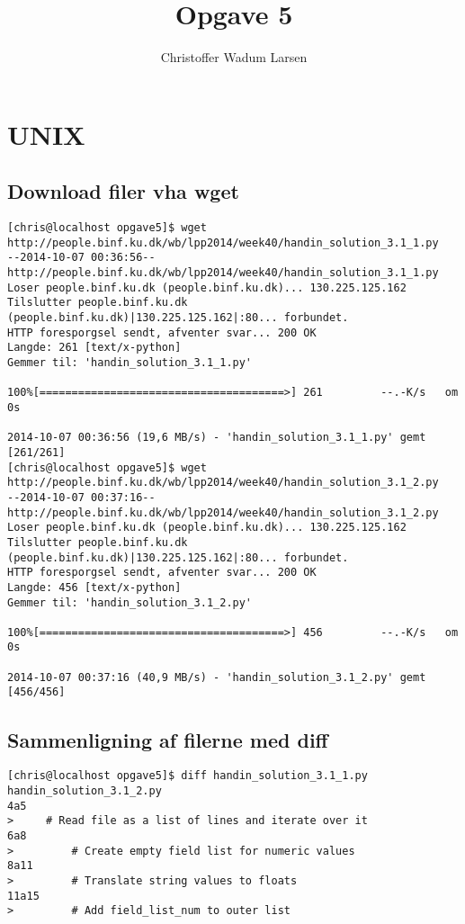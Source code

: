 \documentclass[12pt]{article}
\title{Opgave 5}
\author{Christoffer Wadum Larsen}
\begin{document}
\maketitle

\section{UNIX}

\subsection{Download filer vha wget}

\begin{lstlisting}
[chris@localhost opgave5]$ wget http://people.binf.ku.dk/wb/lpp2014/week40/handin_solution_3.1_1.py
--2014-10-07 00:36:56--  http://people.binf.ku.dk/wb/lpp2014/week40/handin_solution_3.1_1.py
Loser people.binf.ku.dk (people.binf.ku.dk)... 130.225.125.162
Tilslutter people.binf.ku.dk (people.binf.ku.dk)|130.225.125.162|:80... forbundet.
HTTP foresporgsel sendt, afventer svar... 200 OK
Langde: 261 [text/x-python]
Gemmer til: 'handin_solution_3.1_1.py'

100%[======================================>] 261         --.-K/s   om 0s      

2014-10-07 00:36:56 (19,6 MB/s) - 'handin_solution_3.1_1.py' gemt [261/261]
[chris@localhost opgave5]$ wget http://people.binf.ku.dk/wb/lpp2014/week40/handin_solution_3.1_2.py
--2014-10-07 00:37:16--  http://people.binf.ku.dk/wb/lpp2014/week40/handin_solution_3.1_2.py
Loser people.binf.ku.dk (people.binf.ku.dk)... 130.225.125.162
Tilslutter people.binf.ku.dk (people.binf.ku.dk)|130.225.125.162|:80... forbundet.
HTTP foresporgsel sendt, afventer svar... 200 OK
Langde: 456 [text/x-python]
Gemmer til: 'handin_solution_3.1_2.py'

100%[======================================>] 456         --.-K/s   om 0s      

2014-10-07 00:37:16 (40,9 MB/s) - 'handin_solution_3.1_2.py' gemt [456/456]
\end{lstlisting}

\subsection{Sammenligning af filerne med diff}

\begin{lstlisting}
[chris@localhost opgave5]$ diff handin_solution_3.1_1.py handin_solution_3.1_2.py 
4a5
>     # Read file as a list of lines and iterate over it
6a8
>         # Create empty field list for numeric values
8a11
>         # Translate string values to floats
11a15
>         # Add field_list_num to outer list
\end{lstlisting}
\end{document}
